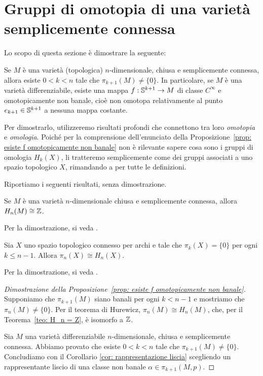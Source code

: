 \section{Gruppi di omotopia di una varietà semplicemente connessa}

Lo scopo di questa sezione è dimostrare la seguente:

\begin{prop}\label{prop: esiste f omotopicamente non banale}
	Se \(M\) è una varietà (topologica) \(n\)-dimensionale, chiusa e semplicemente connessa, allora esiste \(0<k < n\) tale che \(\pi_{k+1}(M) \not = \{0\}\). In particolare, se \(M\) è una varietà differenziabile, esiste una mappa \(f:\mathbb{S}^{k+1} \to M\) di classe \(C^\infty\) e omotopicamente non banale, cioè non omotopa relativamente al punto \(e_{k+1} \in \mathbb{S}^{k+1}\) a nessuna mappa costante. 
\end{prop}

Per dimostrarlo, utilizzeremo risultati profondi che connettono tra loro \textit{omotopia} e \textit{omologia}. Poiché per la comprensione dell'enunciato della Proposizione~\ref{prop: esiste f omotopicamente non banale} non è rilevante sapere cosa sono i gruppi di omologia \(H_k(X)\), li tratteremo semplicemente come dei gruppi associati a uno spazio topologico \(X\), rimandando a \cite{hatcher2000algebraic} per tutte le definizioni. 

Riportiamo i seguenti risultati, senza dimostrazione.

\begin{teo} \label{teo: H_n = Z}
	Se \(M\) è una varietà \(n\)-dimensionale chiusa e semplicemente connessa, allora \(H_n(M) \cong \mathbb{Z}\).
\end{teo}
Per la dimostrazione, si veda \cite[Proposition 3.25 e Theorem 3.26]{hatcher2000algebraic}.

\begin{teo}[Hurewicz]\label{teo: Hurewizc}
	Sia \(X\) uno spazio topologico connesso per archi e tale che \(\pi_k(X)=\{0\}\) per ogni \(k \leq n-1\). Allora \(\pi_n(X)\cong H_n(X)\). 
\end{teo}
Per la dimostrazione, si veda \cite[Theorem 4.32]{hatcher2000algebraic}.

\begin{proof}[Dimostrazione della Proposizione~\ref{prop: esiste f omotopicamente non banale}]
	Supponiamo che \(\pi_{k+1}(M)\) siano banali per ogni \(k < n-1\) e mostriamo che \(\pi_n(M) \not= \{0\}\). Per il teorema di Hurewicz, \(\pi_n(M) \cong H_n(M)\), che, per il Teorema~\ref{teo: H_n = Z}, è isomorfo a \(\mathbb{Z}\).
	
	Sia \(M\) una varietà differenziabile \(n\)-dimensionale, chiusa e semplicemente connessa. Abbiamo provato che esiste \(0<k<n\) tale che \(\pi_{k+1}(M) \neq \{0\}\). Concludiamo con il Corollario \ref{cor: rappresentazione liscia} scegliendo un rappresentante liscio di una classe non banale \(\alpha \in \pi_{k+1}(M,p)\). 
\end{proof}